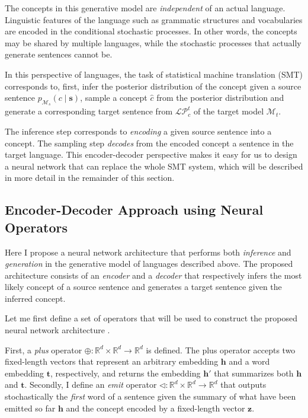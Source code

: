 \documentclass[11pt, oneside]{essay}
\newcommand{\vect}[1]{\mathbf{#1}}
\newcommand{\vh}[0]{\vect{h}}
\newcommand{\vs}[0]{\vect{s}}
\newcommand{\vt}[0]{\vect{t}}
\newcommand{\vz}[0]{\vect{z}}
\newcommand{\RR}[0]{\mathbb{R}}
\begin{document}
The concepts in this generative model are \textit{independent} of
an actual language. Linguistic features of the language such as
grammatic structures and vocabularies are encoded in the
conditional stochastic processes. In other words, the concepts
may be shared by multiple languages, while the stochastic
processes that actually generate sentences cannot be.

In this perspective of languages, the task of statistical machine
translation (SMT) corresponds to, first, infer the posterior
distribution of the concept given a source sentence
$p_{\mathcal{M}_s} (c \mid \vs)$, sample a concept $\hat{c}$ from
the posterior distribution and generate a corresponding target
sentence from $\mathcal{LP}^t_{c}$ of the target model
$\mathcal{M}_t$. 

The inference step corresponds to \textit{encoding} a given
source sentence into a concept. The sampling step
\textit{decodes} from the encoded concept a sentence in the
target language. This encoder-decoder perspective makes it easy
for us to design a neural network that can replace the whole
SMT system, which will be described in more detail in the
remainder of this section.

\subsection{Encoder-Decoder Approach using Neural Operators}
\label{sec:autoencoder}

Here I propose a neural network architecture that performs both
\textit{inference} and \textit{generation} in the generative
model of languages described above.  The proposed architecture
consists of an \textit{encoder} and a \textit{decoder} that
respectively infers the most likely concept of a source sentence
and generates a target sentence given the inferred concept.

Let me first define a set of operators that will be used to
construct the proposed neural network architecture
\citep[see, e.g.,][]{Pascanu2013}. 

First, a \textit{plus} operator $\oplus: \RR^d \times \RR^d \to
\RR^d$ is defined. The plus operator accepts two fixed-length
vectors that represent an arbitrary embedding $\vh$ and a word
embedding $\vt$, respectively, and returns the embedding $\vh'$
that summarizes both $\vh$ and $\vt$. Secondly, I define an
\textit{emit} operator $\lhd: \RR^d \times \RR^d \to \RR^d$ that
outputs stochastically the \textit{first} word of a sentence
given the summary of what have been emitted so far $\vh$ and the
concept encoded by a fixed-length vector $\vz$.
\end{document}
